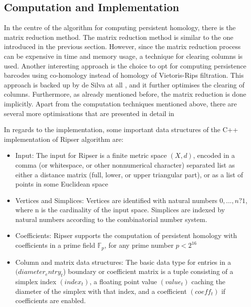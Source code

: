 \documentclass[11pt,a4paper]{report}
\begin{document}
            \subsection{Computation and Implementation}

            In the centre of the algorithm for computing persistent homology, there is the matrix reduction method. The matrix reduction method is similar to the one introduced in the previous section. However, since the matrix reduction process can be expensive in time and memory usage, a technique for clearing columns is used.
            Another interesting approach is the choice to opt for computing persistence barcodes using co-homology instead of homology of Vietoris-Rips filtration. This approach is backed up by de Silva at all \cite{de_Silvia}, and it further optimises the clearing of columns. Furthermore, as already mentioned before, the matrix reduction is done implicitly.
            Apart from the computation techniques mentioned above, there are several more optimisations that are
            presented in detail in \cite{Bauer_2019}

            In regards to the implementation, some important data structures of the C++ implementation of Ripser algorithm are:

            \begin{itemize}
             \item Input: The input for Ripser is a finite metric space $(X, d)$, encoded in a comma (or whitespace, or other nonnumerical character) separated list as either a distance matrix (full, lower, or upper triangular part), or as a list
of points in some Euclidean space
            \item Vertices and Simplices: Vertices are identified with natural numbers ${0, . . . , n ? 1}$, where n is the cardinality of
the input space. Simplices are indexed by natural numbers according to the combinatorial number system.
            \item Coefficients: Ripser supports the computation of persistent homology with coefficients in a prime field $\mathbb{F}_p$, for any prime number $p < 2^{16}$
            \item Column and matrix data structures: The basic data type for entries in a $(diameter_entry_t$) boundary or
coefficient matrix is a tuple consisting of a simplex index $(index_t)$, a floating point value $(value_t)$ caching
the diameter of the simplex with that index, and a coefficient $(coeff_t)$ if coefficients are enabled.

            \end{itemize}
\end{document}
